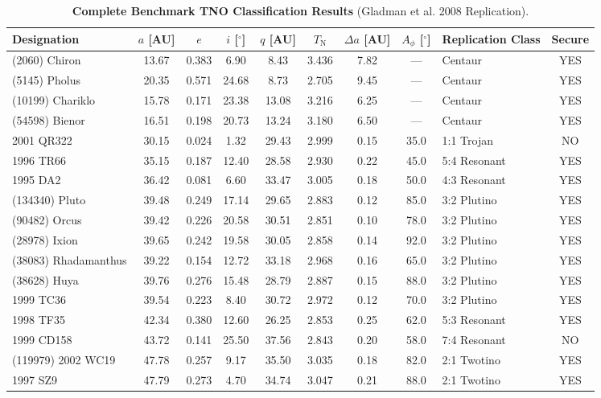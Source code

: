 \documentclass[11pt,a4paper]{article}
\begin{document}
\begin{table}[H]
\centering
\scriptsize
\caption{\textbf{Complete Benchmark TNO Classification Results} (Gladman et al. 2008 Replication).}
\label{tab:catalog}
\begin{tabular}{lccccccclc}
\toprule
\textbf{Designation} & $a$ [AU] & $e$ & $i$ [$^\circ$] & $q$ [AU] & $T_{\text{N}}$ & $\Delta a$ [AU] & $A_\phi$ [$^\circ$] & \textbf{Replication Class} & \textbf{Secure} \\
\midrule
(2060) Chiron & 13.67 & 0.383 & 6.90 & 8.43 & 3.436 & 7.82 & --- & Centaur & YES \\
(5145) Pholus & 20.35 & 0.571 & 24.68 & 8.73 & 2.705 & 9.45 & --- & Centaur & YES \\
(10199) Chariklo & 15.78 & 0.171 & 23.38 & 13.08 & 3.216 & 6.25 & --- & Centaur & YES \\
(54598) Bienor & 16.51 & 0.198 & 20.73 & 13.24 & 3.180 & 6.50 & --- & Centaur & YES \\
2001 QR322 & 30.15 & 0.024 & 1.32 & 29.43 & 2.999 & 0.15 & 35.0 & 1:1 Trojan & NO \\
1996 TR66 & 35.15 & 0.187 & 12.40 & 28.58 & 2.930 & 0.22 & 45.0 & 5:4 Resonant & YES \\
1995 DA2 & 36.42 & 0.081 & 6.60 & 33.47 & 3.005 & 0.18 & 50.0 & 4:3 Resonant & YES \\
(134340) Pluto & 39.48 & 0.249 & 17.14 & 29.65 & 2.883 & 0.12 & 85.0 & 3:2 Plutino & YES \\
(90482) Orcus & 39.42 & 0.226 & 20.58 & 30.51 & 2.851 & 0.10 & 78.0 & 3:2 Plutino & YES \\
(28978) Ixion & 39.65 & 0.242 & 19.58 & 30.05 & 2.858 & 0.14 & 92.0 & 3:2 Plutino & YES \\
(38083) Rhadamanthus & 39.22 & 0.154 & 12.72 & 33.18 & 2.968 & 0.16 & 65.0 & 3:2 Plutino & YES \\
(38628) Huya & 39.76 & 0.276 & 15.48 & 28.79 & 2.887 & 0.15 & 88.0 & 3:2 Plutino & YES \\
1999 TC36 & 39.54 & 0.223 & 8.40 & 30.72 & 2.972 & 0.12 & 70.0 & 3:2 Plutino & YES \\
1998 TF35 & 42.34 & 0.380 & 12.60 & 26.25 & 2.853 & 0.25 & 62.0 & 5:3 Resonant & YES \\
1999 CD158 & 43.72 & 0.141 & 25.50 & 37.56 & 2.843 & 0.20 & 58.0 & 7:4 Resonant & NO \\
(119979) 2002 WC19 & 47.78 & 0.257 & 9.17 & 35.50 & 3.035 & 0.18 & 82.0 & 2:1 Twotino & YES \\
1997 SZ9 & 47.79 & 0.273 & 4.70 & 34.74 & 3.047 & 0.21 & 88.0 & 2:1 Twotino & YES \\

\end{tabular}
\end{table}
\end{document}
